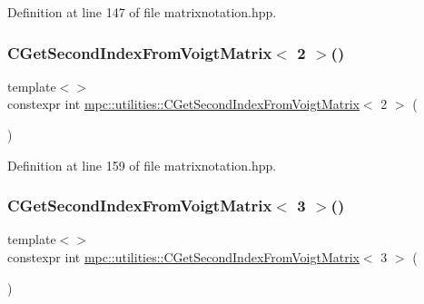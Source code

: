 Definition at line 147 of file matrixnotation.\+hpp.

\mbox{\label{namespacempc_1_1utilities_ace2b5aa12b0c53dfb13b277172f636d3}} 
\subsubsection{\texorpdfstring{C\+Get\+Second\+Index\+From\+Voigt\+Matrix$<$ 2 $>$()}{CGetSecondIndexFromVoigtMatrix< 2 >()}}
{\footnotesize\ttfamily template$<$$>$ \\
constexpr int \mbox{\hyperlink{namespacempc_1_1utilities_a094a324d81b996e8397336286264dfcd}{mpc\+::utilities\+::\+C\+Get\+Second\+Index\+From\+Voigt\+Matrix}}$<$ 2 $>$ (\begin{DoxyParamCaption}{ }\end{DoxyParamCaption})\hspace{0.3cm}{\ttfamily [inline]}}



Definition at line 159 of file matrixnotation.\+hpp.

\mbox{\label{namespacempc_1_1utilities_a1ab261832775728a8dd9aec99a9b8255}} 
\subsubsection{\texorpdfstring{C\+Get\+Second\+Index\+From\+Voigt\+Matrix$<$ 3 $>$()}{CGetSecondIndexFromVoigtMatrix< 3 >()}}
{\footnotesize\ttfamily template$<$$>$ \\
constexpr int \mbox{\hyperlink{namespacempc_1_1utilities_a094a324d81b996e8397336286264dfcd}{mpc\+::utilities\+::\+C\+Get\+Second\+Index\+From\+Voigt\+Matrix}}$<$ 3 $>$ (\begin{DoxyParamCaption}{ }\end{DoxyParamCaption})\hspace{0.3cm}{\ttfamily [inline]}}



